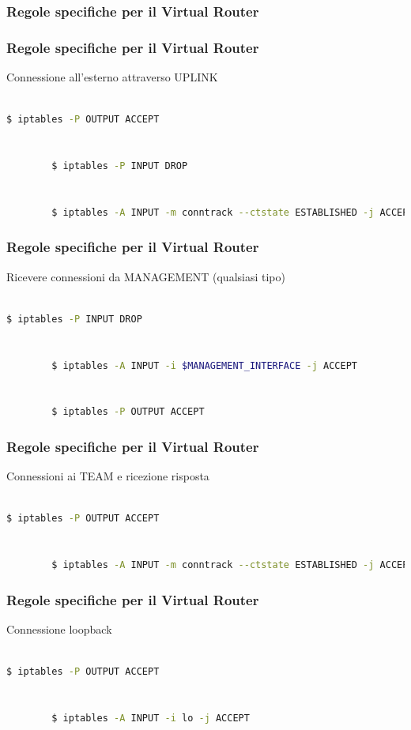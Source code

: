 \documentclass{beamer}
\begin{document}
\lstset{style=bash}
\subsubsection{Regole specifiche per il Virtual Router}
\begin{frame}[fragile]
    \frametitle{Regole specifiche per il Virtual Router}
    Connessione all'esterno attraverso UPLINK
    \\~\\
    \begin{lstlisting}[language=sh]
        $ iptables -P OUTPUT ACCEPT

        
        $ iptables -P INPUT DROP
        

        $ iptables -A INPUT -m conntrack --ctstate ESTABLISHED -j ACCEPT           
    \end{lstlisting}
\end{frame}

\begin{frame}[fragile]
    \frametitle{Regole specifiche per il Virtual Router}
    Ricevere connessioni da MANAGEMENT (qualsiasi tipo)
    \\~\\
    \begin{lstlisting}[language=sh]
        $ iptables -P INPUT DROP
        
        
        $ iptables -A INPUT -i $MANAGEMENT_INTERFACE -j ACCEPT
        
        
        $ iptables -P OUTPUT ACCEPT           
    \end{lstlisting}
\end{frame}

\begin{frame}[fragile]
    \frametitle{Regole specifiche per il Virtual Router}
    Connessioni ai TEAM e ricezione risposta
    \\~\\
    \begin{lstlisting}[language=sh]
        $ iptables -P OUTPUT ACCEPT
        
        
        $ iptables -A INPUT -m conntrack --ctstate ESTABLISHED -j ACCEPT           
    \end{lstlisting}
\end{frame}

\begin{frame}[fragile]
    \frametitle{Regole specifiche per il Virtual Router}
    Connessione loopback
    \\~\\
    \begin{lstlisting}[language=sh]
        $ iptables -P OUTPUT ACCEPT


        $ iptables -A INPUT -i lo -j ACCEPT           
    \end{lstlisting}
\end{frame}
\end{document}
